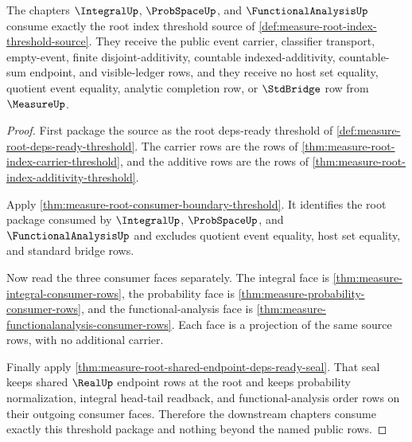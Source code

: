 \begin{theorem}
\label{thm:measure-root-index-downstream-threshold}
The chapters $\IntegralUp$, $\ProbSpaceUp$, and $\FunctionalAnalysisUp$
consume exactly the root index threshold source of
\autoref{def:measure-root-index-threshold-source}. They receive the public
event carrier, classifier transport, empty-event, finite disjoint-additivity,
countable indexed-additivity, countable-sum endpoint, and visible-ledger rows,
and they receive no host set equality, quotient event equality, analytic
completion row, or $\StdBridge$ row from $\MeasureUp$.
\end{theorem}
\begin{proof}
First package the source as the root deps-ready threshold of
\autoref{def:measure-root-deps-ready-threshold}. The carrier rows are the rows
of \autoref{thm:measure-root-index-carrier-threshold}, and the additive rows
are the rows of \autoref{thm:measure-root-index-additivity-threshold}.

Apply \autoref{thm:measure-root-consumer-boundary-threshold}. It identifies
the root package consumed by $\IntegralUp$, $\ProbSpaceUp$, and
$\FunctionalAnalysisUp$ and excludes quotient event equality, host set
equality, and standard bridge rows.

Now read the three consumer faces separately. The integral face is
\autoref{thm:measure-integral-consumer-rows}, the probability face is
\autoref{thm:measure-probability-consumer-rows}, and the
functional-analysis face is
\autoref{thm:measure-functionalanalysis-consumer-rows}. Each face is a
projection of the same source rows, with no additional carrier.

Finally apply \autoref{thm:measure-root-shared-endpoint-deps-ready-seal}.
That seal keeps shared $\RealUp$ endpoint rows at the root and keeps
probability normalization, integral head-tail readback, and
functional-analysis order rows on their outgoing consumer faces. Therefore
the downstream chapters consume exactly this threshold package and nothing
beyond the named public rows.
\end{proof}
